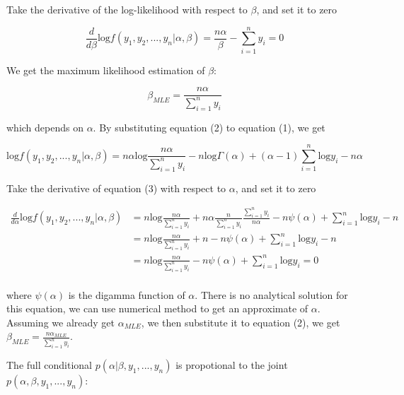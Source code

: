 \documentclass[12pt]{article}
\begin{document}
Take the derivative of the log-likelihood with respect to $\beta$, and set it to zero

\begin{equation*}
\frac{d}{d \beta} \text{log} f(y_{1}, y_{2},...,y_{n} | \alpha, \beta) = \frac{n\alpha}{\beta} - \sum_{i=1}^n y_i = 0
\end{equation*}

We get the maximum likelihood estimation of $\beta$: 

\begin{equation}
\beta_{MLE} = \frac{n\alpha}{\sum_{i=1}^n y_i}
\end{equation}

which depends on $\alpha$. By substituting equation (2) to equation (1), we get 

\begin{equation}
\text{log} f(y_{1}, y_{2},...,y_{n} | \alpha, \beta) = n\alpha \text{log}\frac{n\alpha}{\sum_{i=1}^n y_i} - n\text{log}\Gamma(\alpha) + (\alpha-1)\sum_{i=1}^n \text{log}y_i - n\alpha
\end{equation} 

Take the derivative of equation (3) with respect to $\alpha$, and set it to zero

\begin{equation*}
\begin{split}
\frac{d}{d \alpha} \text{log} f(y_{1}, y_{2},...,y_{n} | \alpha, \beta) &= n\text{log}\frac{n\alpha}{\sum_{i=1}^n y_i} + n\alpha\frac{n}{\sum_{i=1}^n y_i}\frac{\sum_{i=1}^n y_i}{n\alpha} - n\psi(\alpha) + 
\sum_{i=1}^n \text{log} y_i - n \\
&= n\text{log}\frac{n\alpha}{\sum_{i=1}^n y_i} + n - n\psi(\alpha) + \sum_{i=1}^n \text{log} y_i - n \\
&= n\text{log}\frac{n\alpha}{\sum_{i=1}^n y_i} - n\psi(\alpha) + \sum_{i=1}^n \text{log} y_i = 0 \\
\end{split}
\end{equation*}

where $\psi(\alpha)$ is the digamma function of $\alpha$. There is no analytical solution for this equation, we can use numerical method to get an approximate of $\alpha$. Assuming we already get $\alpha_{MLE}$, we then substitute it to equation (2), we get $\beta_{MLE} = \frac{n\alpha_{MLE}}{\sum_{i=1}^n y_i}$.

The full conditional $p(\alpha | \beta, y_1,...,y_n)$ is propotional to the joint $p(\alpha, \beta, y_1,...,y_n)$:
\end{document}
